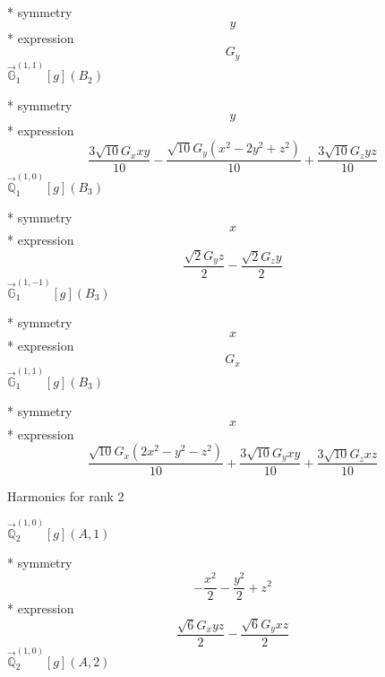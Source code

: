 \documentclass[fleqn,8pt]{jsarticle}
\begin{document}
\noindent\quad ** symmetry
\begin{dmath*}
y
\end{dmath*}
\noindent\quad ** expression
\begin{dmath*}
G_{y}
\end{dmath*}
\noindent\quad $\vec{\mathbb{G}}_{1}^{(1,1)}[g](B_{2})$

\noindent\quad ** symmetry
\begin{dmath*}
y
\end{dmath*}
\noindent\quad ** expression
\begin{dmath*}
\frac{3 \sqrt{10} G_{x} x y}{10} - \frac{\sqrt{10} G_{y} \left(x^{2} - 2 y^{2} + z^{2}\right)}{10} + \frac{3 \sqrt{10} G_{z} y z}{10}
\end{dmath*}
\noindent\quad $\vec{\mathbb{Q}}_{1}^{(1,0)}[g](B_{3})$

\noindent\quad ** symmetry
\begin{dmath*}
x
\end{dmath*}
\noindent\quad ** expression
\begin{dmath*}
\frac{\sqrt{2} G_{y} z}{2} - \frac{\sqrt{2} G_{z} y}{2}
\end{dmath*}
\noindent\quad $\vec{\mathbb{G}}_{1}^{(1,-1)}[g](B_{3})$

\noindent\quad ** symmetry
\begin{dmath*}
x
\end{dmath*}
\noindent\quad ** expression
\begin{dmath*}
G_{x}
\end{dmath*}
\noindent\quad $\vec{\mathbb{G}}_{1}^{(1,1)}[g](B_{3})$

\noindent\quad ** symmetry
\begin{dmath*}
x
\end{dmath*}
\noindent\quad ** expression
\begin{dmath*}
\frac{\sqrt{10} G_{x} \left(2 x^{2} - y^{2} - z^{2}\right)}{10} + \frac{3 \sqrt{10} G_{y} x y}{10} + \frac{3 \sqrt{10} G_{z} x z}{10}
\end{dmath*}

\noindent * Harmonics for rank 2

\noindent\quad $\vec{\mathbb{Q}}_{2}^{(1,0)}[g](A,1)$

\noindent\quad ** symmetry
\begin{dmath*}
- \frac{x^{2}}{2} - \frac{y^{2}}{2} + z^{2}
\end{dmath*}
\noindent\quad ** expression
\begin{dmath*}
\frac{\sqrt{6} G_{x} y z}{2} - \frac{\sqrt{6} G_{y} x z}{2}
\end{dmath*}
\noindent\quad $\vec{\mathbb{Q}}_{2}^{(1,0)}[g](A,2)$
\end{document}
